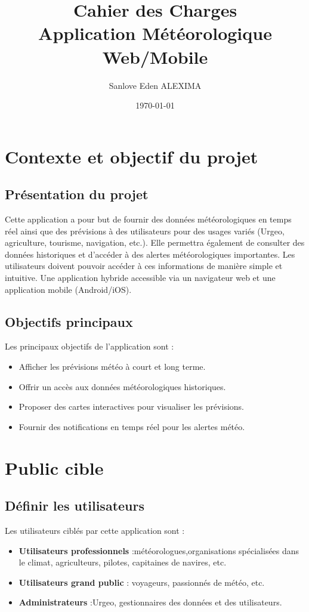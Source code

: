 \documentclass[a4paper,12pt]{article}
\title{Cahier des Charges\\Application Météorologique Web/Mobile}
\author{Sanlove Eden ALEXIMA}
\date{\today}
\begin{document}
\maketitle

\tableofcontents
\newpage

\section{Contexte et objectif du projet}
\subsection{Présentation du projet}
Cette application a pour but de fournir des données météorologiques en temps réel ainsi que des prévisions à des utilisateurs pour des usages variés (Urgeo, agriculture, tourisme, navigation, etc.). 
Elle permettra également de consulter des données historiques et d'accéder à des alertes météorologiques importantes. Les utilisateurs doivent pouvoir accéder à ces informations de manière simple et intuitive. Une application hybride accessible via un navigateur web et une application mobile (Android/iOS).

\subsection{Objectifs principaux}
Les principaux objectifs de l'application sont :
\begin{itemize}
    \item Afficher les prévisions météo à court et long terme.
    \item Offrir un accès aux données météorologiques historiques.
    \item Proposer des cartes interactives pour visualiser les prévisions.
    \item Fournir des notifications en temps réel pour les alertes météo.
\end{itemize}

\section{Public cible}
\subsection{Définir les utilisateurs}
Les utilisateurs ciblés par cette application sont :
\begin{itemize}
    \item \textbf{Utilisateurs professionnels} :météorologues,organisations spécialisées dans le climat, agriculteurs, pilotes, capitaines de navires, etc.
    \item \textbf{Utilisateurs grand public} : voyageurs, passionnés de météo, etc.
    \item \textbf{Administrateurs} :Urgeo, gestionnaires des données et des utilisateurs.
\end{itemize}
\end{document}
